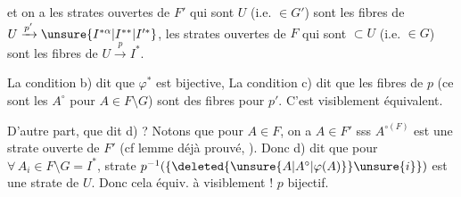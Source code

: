 
et on a
les  strates ouvertes de $F'$ qui sont  \inserted{$\subset$} $U$ (i.e.   $\in G'$) sont les fibres de $U\xrightarrow{p'}\unsure{I^{*\alpha}|I^{**}|I'^{*}}$, les strates ouvertes de $F$ qui sont $\subset U$ (i.e.  $\in G$) sont les fibres de $U\xrightarrow{p}I^{*}$.

La condition b) dit que $\varphi^{*}$ est bijective,
La condition c) dit que les fibres de $p$ (ce sont les $A^\circ$ pour $A\in F\setminus G$) sont des fibres pour $p'$. C'est  visiblement équivalent.


D'autre part, que dit d) ? Notons  que pour $A\in F$, on a $A\in F'$ sss $A^{\circ(F)}$ est une strate ouverte de $F'$ (cf lemme déjà prouvé, ). Donc d) dit que pour $\forall\,A_i\in F\setminus G=I^{*}$,   strate $p^{-1}(\{\deleted{\unsure{A|A^\circ|\varphi(A)}}\unsure{i}\})$ est une strate  de $U$. Donc cela équiv. à visiblement ! $p$ bijectif.

